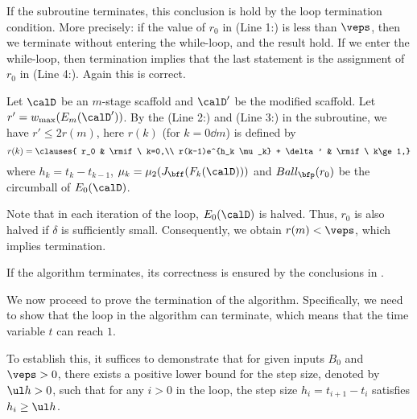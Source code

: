 	\bpf
	\benum[(a)]
	\item If the subroutine terminates, this conclusion is hold by  the
	loop termination condition.
	More precisely: if the value of $r_0$ in (Line 1:) is
	less than $\veps$, then we terminate without entering
	the while-loop, and the result hold.
	If we enter the while-loop, then termination implies
	that the last statement is the assignment of $r_0$ in (Line 4:).
	Again this is correct.
	\item 
	Let $\calD$ be an $m$-stage scaffold and $\calD'$ be the
	modified scaffold.
	Let
	$r' = \wmax(E_m(\calD')) $.
	By the (Line 2:) %
	and (Line 3:) %
	in the subroutine, we have $r' \leq 2r(m) $,
	here $r(k)$ (for $k=0\dd m$) is defined by
	\[
	r(k) = \clauses{ r_0 & \rmif\ k=0,\\
		r(k-1)e^{h_k \mu_k} + \delta' & \rmif\ k\ge 1,}
	\]
	where $h_k=t_k-t_{k-1}$,
	$\mu_k=\mu_2(J_{\bff}(F_k(\calD)))$ and $Ball_\bfp(r_0)$ be the circumball of $E_{0}(\calD)$.
	
	Note that in each iteration of the loop, $ E_0(\calD) $ is
	halved.  Thus, $r_0$ is also halved if $ \delta $ is sufficiently small. Consequently, we obtain 
	$ r(m) < \veps $, which implies termination.
	\eenum
	\epf
	
	\bpf
	
	If the algorithm terminates, its correctness is ensured by the
	conclusions in .
	
	We now proceed to prove the termination of the algorithm. Specifically,
	we need to show that the loop in the algorithm can terminate, which
	means that the time variable $ t $ can reach $ 1 $. 
	
	To establish this, it suffices to demonstrate that for given inputs $
	B_0 $ and $ \veps > 0 $, there exists a positive lower bound for the
	step size, denoted by $ \ul h > 0 $, such that for any $ i > 0 $ in the
	loop, the step size $ h_i = t_{i+1} - t_i $ satisfies $ h_i \geq \ul h
	$.
	
